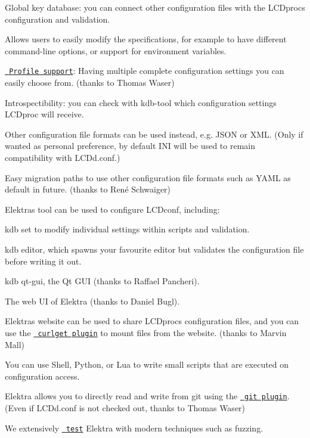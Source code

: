 \begin{DoxyItemize}
\item Global key database\+: you can connect other configuration files with the L\+C\+Dproc\textquotesingle{}s configuration and validation.
\item Allows users to easily modify the specifications, for example to have different command-\/line options, or support for environment variables.
\item \href{https://www.libelektra.org/plugins/profile}{\texttt{ Profile support}}\+: Having multiple complete configuration settings you can easily choose from. (thanks to Thomas Waser)
\item Introspectibility\+: you can check with {\ttfamily kdb}-\/tool which configuration settings L\+C\+Dproc will receive.
\item Other configuration file formats can be used instead, e.\+g. J\+S\+ON or X\+ML. (Only if wanted as personal preference, by default I\+NI will be used to remain compatibility with {\ttfamily L\+C\+Dd.\+conf}.)
\item Easy migration paths to use other configuration file formats such as Y\+A\+ML as default in future. (thanks to René Schwaiger)
\item Elektra\textquotesingle{}s tool can be used to configure L\+C\+Dconf, including\+:
\begin{DoxyItemize}
\item {\ttfamily kdb set} to modify individual settings within scripts and validation.
\item {\ttfamily kdb editor}, which spawns your favourite editor but validates the configuration file before writing it out.
\item {\ttfamily kdb qt-\/gui}, the Qt G\+UI (thanks to Raffael Pancheri).
\item The web UI of Elektra (thanks to Daniel Bugl).
\end{DoxyItemize}
\item Elektra\textquotesingle{}s website can be used to share L\+C\+Dproc\textquotesingle{}s configuration files, and you can use the \href{https://www.libelektra.org/plugins/curlget}{\texttt{ curlget plugin}} to mount files from the website. (thanks to Marvin Mall)
\item You can use Shell, Python, or Lua to write small scripts that are executed on configuration access.
\item Elektra allows you to directly read and write from git using the \href{https://www.libelektra.org/plugins/gitresolver}{\texttt{ git plugin}}. (Even if {\ttfamily L\+C\+Dd.\+conf} is not checked out, thanks to Thomas Waser)
\item We extensively \href{https://www.libelektra.org/devgettingstarted/testing}{\texttt{ test}} Elektra with modern techniques such as fuzzing.
\end{DoxyItemize}

